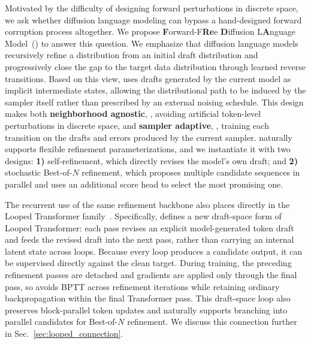 Motivated by the difficulty of designing forward perturbations in discrete space, we ask whether diffusion language modeling can bypass a hand-designed forward corruption process altogether.
We propose \textbf{F}orward-F\textbf{Re}e \textbf{D}iffusion L\textbf{A}nguage Model~(\method) to answer this question.
We emphasize that diffusion language models recursively refine a distribution from an initial draft distribution and progressively close the gap to the target data distribution through learned reverse transitions.
Based on this view, \method uses drafts generated by the current model as implicit intermediate states, allowing the distributional path to be induced by the sampler itself rather than prescribed by an external noising schedule.
This design makes \method both {\bf neighborhood agnostic}, \ie, avoiding artificial token-level perturbations in discrete space, and {\bf sampler adaptive}, \ie, training each transition on the drafts and errors produced by the current sampler.
\method naturally supports flexible refinement parameterizations, and we instantiate it with two designs: {\bf 1)} self-refinement, which directly revises the model's own draft; and {\bf 2)} stochastic Best-of-$N$ refinement, which proposes multiple candidate sequences in parallel and uses an additional score head to select the most promising one.

The recurrent use of the same refinement backbone also places \method directly in the Looped Transformer family~\citep{dehghani2019universal,saunshi2025latentthoughts,geiping2025recurrentdepth}.
Specifically, \method defines a new draft-space form of Looped Transformer: each pass revises an explicit model-generated token draft and feeds the revised draft into the next pass, rather than carrying an internal latent state across loops.
Because every loop produces a candidate output, it can be supervised directly against the clean target.
During training, the preceding refinement passes are detached and gradients are applied only through the final pass, so \method avoids BPTT across refinement iterations while retaining ordinary backpropagation within the final Transformer pass.
This draft-space loop also preserves block-parallel token updates and naturally supports branching into parallel candidates for Best-of-$N$ refinement.
We discuss this connection further in Sec.~\ref{sec:looped_connection}.


